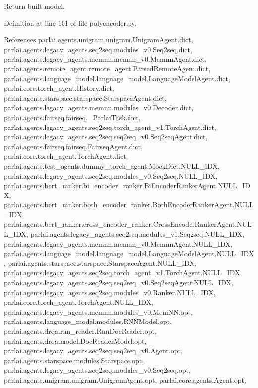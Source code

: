 \begin{DoxyVerb}Return built model.\end{DoxyVerb}
 

Definition at line 101 of file polyencoder.\+py.



References parlai.\+agents.\+unigram.\+unigram.\+Unigram\+Agent.\+dict, parlai.\+agents.\+legacy\+\_\+agents.\+seq2seq.\+modules\+\_\+v0.\+Seq2seq.\+dict, parlai.\+agents.\+legacy\+\_\+agents.\+memnn.\+memnn\+\_\+v0.\+Memnn\+Agent.\+dict, parlai.\+agents.\+remote\+\_\+agent.\+remote\+\_\+agent.\+Parsed\+Remote\+Agent.\+dict, parlai.\+agents.\+language\+\_\+model.\+language\+\_\+model.\+Language\+Model\+Agent.\+dict, parlai.\+core.\+torch\+\_\+agent.\+History.\+dict, parlai.\+agents.\+starspace.\+starspace.\+Starspace\+Agent.\+dict, parlai.\+agents.\+legacy\+\_\+agents.\+memnn.\+modules\+\_\+v0.\+Decoder.\+dict, parlai.\+agents.\+fairseq.\+fairseq.\+\_\+\+Parlai\+Task.\+dict, parlai.\+agents.\+legacy\+\_\+agents.\+seq2seq.\+torch\+\_\+agent\+\_\+v1.\+Torch\+Agent.\+dict, parlai.\+agents.\+legacy\+\_\+agents.\+seq2seq.\+seq2seq\+\_\+v0.\+Seq2seq\+Agent.\+dict, parlai.\+agents.\+fairseq.\+fairseq.\+Fairseq\+Agent.\+dict, parlai.\+core.\+torch\+\_\+agent.\+Torch\+Agent.\+dict, parlai.\+agents.\+test\+\_\+agents.\+dummy\+\_\+torch\+\_\+agent.\+Mock\+Dict.\+N\+U\+L\+L\+\_\+\+I\+DX, parlai.\+agents.\+legacy\+\_\+agents.\+seq2seq.\+modules\+\_\+v0.\+Seq2seq.\+N\+U\+L\+L\+\_\+\+I\+DX, parlai.\+agents.\+bert\+\_\+ranker.\+bi\+\_\+encoder\+\_\+ranker.\+Bi\+Encoder\+Ranker\+Agent.\+N\+U\+L\+L\+\_\+\+I\+DX, parlai.\+agents.\+bert\+\_\+ranker.\+both\+\_\+encoder\+\_\+ranker.\+Both\+Encoder\+Ranker\+Agent.\+N\+U\+L\+L\+\_\+\+I\+DX, parlai.\+agents.\+bert\+\_\+ranker.\+cross\+\_\+encoder\+\_\+ranker.\+Cross\+Encoder\+Ranker\+Agent.\+N\+U\+L\+L\+\_\+\+I\+DX, parlai.\+agents.\+legacy\+\_\+agents.\+seq2seq.\+modules\+\_\+v1.\+Seq2seq.\+N\+U\+L\+L\+\_\+\+I\+DX, parlai.\+agents.\+legacy\+\_\+agents.\+memnn.\+memnn\+\_\+v0.\+Memnn\+Agent.\+N\+U\+L\+L\+\_\+\+I\+DX, parlai.\+agents.\+language\+\_\+model.\+language\+\_\+model.\+Language\+Model\+Agent.\+N\+U\+L\+L\+\_\+\+I\+DX, parlai.\+agents.\+starspace.\+starspace.\+Starspace\+Agent.\+N\+U\+L\+L\+\_\+\+I\+DX, parlai.\+agents.\+legacy\+\_\+agents.\+seq2seq.\+torch\+\_\+agent\+\_\+v1.\+Torch\+Agent.\+N\+U\+L\+L\+\_\+\+I\+DX, parlai.\+agents.\+legacy\+\_\+agents.\+seq2seq.\+seq2seq\+\_\+v0.\+Seq2seq\+Agent.\+N\+U\+L\+L\+\_\+\+I\+DX, parlai.\+agents.\+legacy\+\_\+agents.\+seq2seq.\+modules\+\_\+v0.\+Ranker.\+N\+U\+L\+L\+\_\+\+I\+DX, parlai.\+core.\+torch\+\_\+agent.\+Torch\+Agent.\+N\+U\+L\+L\+\_\+\+I\+DX, parlai.\+agents.\+legacy\+\_\+agents.\+memnn.\+modules\+\_\+v0.\+Mem\+N\+N.\+opt, parlai.\+agents.\+language\+\_\+model.\+modules.\+R\+N\+N\+Model.\+opt, parlai.\+agents.\+drqa.\+rnn\+\_\+reader.\+Rnn\+Doc\+Reader.\+opt, parlai.\+agents.\+drqa.\+model.\+Doc\+Reader\+Model.\+opt, parlai.\+agents.\+legacy\+\_\+agents.\+seq2seq.\+seq2seq\+\_\+v0.\+Agent.\+opt, parlai.\+agents.\+starspace.\+modules.\+Starspace.\+opt, parlai.\+agents.\+legacy\+\_\+agents.\+seq2seq.\+modules\+\_\+v0.\+Seq2seq.\+opt, parlai.\+agents.\+unigram.\+unigram.\+Unigram\+Agent.\+opt, parlai.\+core.\+agents.\+Agent.\+opt, 